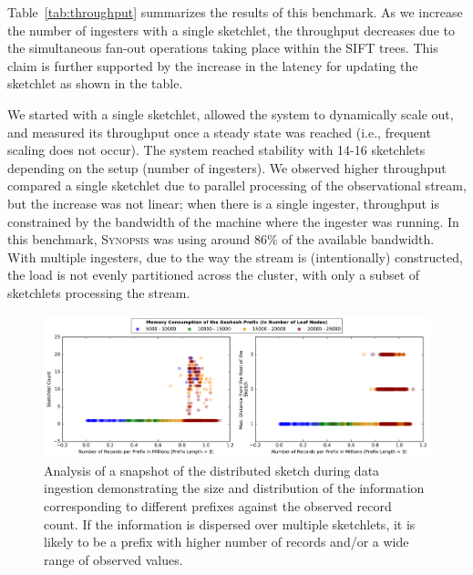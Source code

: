 Table~\ref{tab:throughput} summarizes the results of this benchmark.
As we increase the number of ingesters with a single sketchlet, the throughput decreases due to the simultaneous fan-out operations taking place within the SIFT trees. This claim is further supported by the increase in the latency for updating the sketchlet as shown in the table.

We started with a single sketchlet, allowed the system to dynamically scale out, and measured its throughput once a steady state was reached (i.e., frequent scaling does not occur).
The system reached stability with 14-16 sketchlets depending on the setup (number of ingesters).
We observed higher throughput compared a single sketchlet due to parallel processing of the observational stream, but the increase was not linear; when there is a single ingester, throughput is constrained by the bandwidth of the machine where the ingester was running. In this benchmark, \textsc{Synopsis} was using around 86\% of the available bandwidth.
With multiple ingesters, due to the way the stream is (intentionally) constructed, the load is not evenly partitioned across the cluster, with only a subset of sketchlets processing the stream.
%
\begin{figure}
    \centerline{\includegraphics[width=\linewidth]{figures/scaleout_graph_analysis.pdf}}
    \caption{Analysis of a snapshot of the distributed sketch during data ingestion demonstrating the size and distribution of the information corresponding to different prefixes against the observed record count. If the information is dispersed over multiple sketchlets, it is likely to be a prefix with higher number of records and/or a wide range of observed values.}
    \label{fig:scaleout-graph-analysis}
\end{figure}
%
